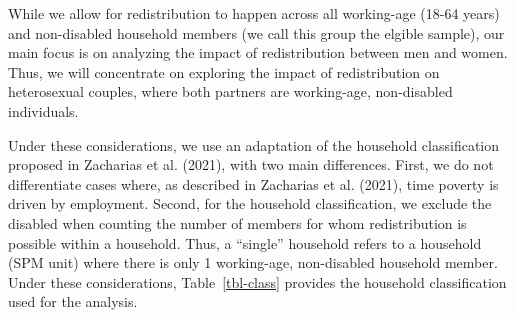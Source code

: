 \documentclass[
  11pt,
]{article}
\begin{document}
While we allow for redistribution to happen across all working-age
(18-64 years) and non-disabled household members (we call this group the
elgible sample), our main focus is on analyzing the impact of
redistribution between men and women. Thus, we will concentrate on
exploring the impact of redistribution on heterosexual couples, where
both partners are working-age, non-disabled individuals.

Under these considerations, we use an adaptation of the household
classification proposed in Zacharias et al. (2021), with two main
differences. First, we do not differentiate cases where, as described in
Zacharias et al. (2021), time poverty is driven by employment. Second,
for the household classification, we exclude the disabled when counting
the number of members for whom redistribution is possible within a
household. Thus, a ``single'' household refers to a household (SPM unit)
where there is only 1 working-age, non-disabled household member. Under
these considerations, Table~\ref{tbl-class} provides the household
classification used for the analysis.
\end{document}
